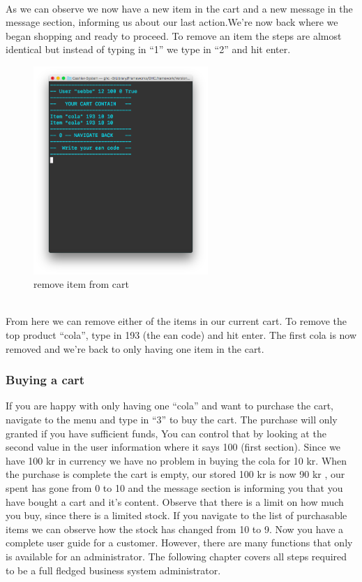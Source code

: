 \documentclass[11pt]{article}
\begin{document}
\\
\newpage
As we can observe we now have a new item in the cart and a new message in the  message section, informing us about our last action.We’re now back where we began shopping and ready to proceed. To remove an item the steps are almost identical but instead of typing in “1” we type in “2” and hit enter.
\\
\begin{figure}[h!]
  \includegraphics[width=250px]{interface5.png}
  \caption{remove item from cart}
\end{figure}
\\
From here we can remove either of the items in our current cart. To remove the top product “cola”, type in 193 (the ean code) and hit enter. The first cola is now removed and we’re back to only having one item in the cart.\newpage
\subsubsection{Buying a cart}
If you are happy with only having one “cola” and want to purchase the cart, navigate to the menu and type in “3” to buy the cart. The purchase will only granted if you have sufficient funds, You can control that by looking at the second value in the user information where it says 100 (first section). Since we have 100 kr in currency we have no problem in buying the cola for 10 kr. When the purchase is complete the cart is empty, our stored 100 kr is now 90 kr , our spent has gone from 0 to 10 and the message section is informing you that you have bought a cart and it’s content. Observe that there is a limit on how much you buy, since there is a limited stock. If you navigate to the list of purchasable items we can observe how the stock has changed from 10 to 9. Now you have a complete user guide for a customer. However, there are many functions that only is available for an administrator. The following chapter covers all steps required to be a full fledged business system administrator.\\
\end{document}

